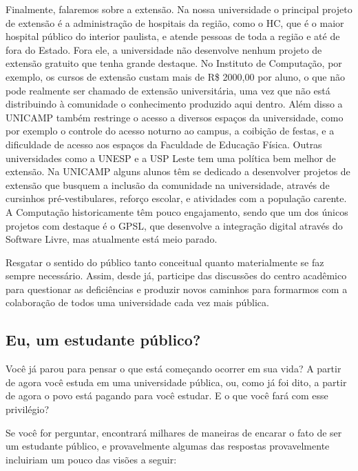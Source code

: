 \documentclass[a4paper,10pt]{article}
\begin{document}
Finalmente, falaremos sobre a extensão. Na nossa universidade o principal
projeto de extensão é a administração de hospitais da região, como o HC, que
é o maior hospital público do interior paulista, e atende pessoas de toda
a região e até de fora do Estado. Fora ele, a universidade não desenvolve nenhum
projeto de extensão gratuito que tenha grande destaque. No Instituto de
Computação, por exemplo, os cursos de extensão custam mais de R\$ 2000,00 por
aluno, o que não pode realmente ser chamado de extensão universitária, uma vez
que não está distribuindo à comunidade o conhecimento produzido aqui dentro.
Além disso a UNICAMP também restringe o acesso a diversos espaços da
universidade, como por exemplo o controle do acesso noturno ao campus,
a coibição de festas, e a dificuldade de acesso aos espaços da Faculdade de
Educação Física. Outras universidades como a UNESP e a USP Leste tem uma
política bem melhor de extensão. Na UNICAMP alguns alunos têm se dedicado
a desenvolver projetos de extensão que busquem a inclusão da comunidade na
universidade, através de cursinhos pré-vestibulares, reforço escolar,
e atividades com a população carente. A Computação historicamente têm pouco
engajamento, sendo que um dos únicos projetos com destaque é o GPSL, que
desenvolve a integração digital através do Software Livre, mas atualmente está
meio parado.

Resgatar o sentido do público tanto conceitual quanto materialmente se faz
sempre necessário. Assim, desde já, participe das discussões do centro acadêmico
para questionar as deficiências e produzir novos caminhos para formarmos com
a colaboração de todos uma universidade cada vez mais pública.

\subsection{Eu, um estudante público?} Você já parou para pensar o que está
começando ocorrer em sua vida? A partir de agora você estuda em uma universidade
pública, ou, como já foi dito, a partir de agora o povo está pagando para você
estudar. E o que você fará com esse privilégio?

Se você for perguntar, encontrará milhares de maneiras de encarar o fato de ser
um estudante público, e provavelmente algumas das respostas provavelmente
incluiriam um pouco das visões a seguir:
\end{document}

